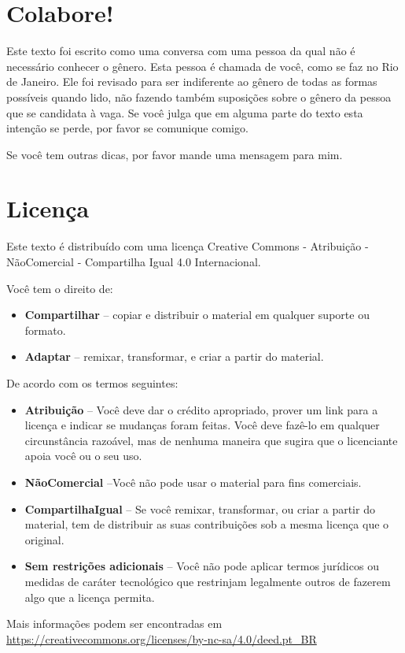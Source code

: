 \documentclass{article}
\begin{document}
\section{Colabore!}

Este texto foi escrito como uma conversa com uma pessoa da qual não é necessário conhecer o gênero. Esta pessoa é chamada de você, como se faz no Rio de Janeiro. Ele foi revisado para ser indiferente ao gênero de todas as formas possíveis quando lido, não fazendo também suposições sobre o gênero da pessoa que se candidata à vaga. Se você julga que em alguma parte do texto esta intenção se perde, por favor se comunique comigo.

Se você tem outras dicas, por favor mande uma mensagem para mim.

\section{Licença}

Este texto é distribuído com uma licença Creative Commons - Atribuição - NãoComercial - Compartilha Igual 4.0 Internacional.


Você tem o direito de:
\begin{itemize}
\item \textbf{Compartilhar} -- copiar e distribuir o material em qualquer suporte ou formato.
\item \textbf{Adaptar} -- remixar, transformar, e criar a partir do material.
\end{itemize}

De acordo com os termos seguintes:
\begin{itemize}
\item \textbf{Atribuição} -- Você deve dar o crédito apropriado, prover um link para a licença e indicar se mudanças foram feitas. Você deve fazê-lo em qualquer circunstância razoável, mas de nenhuma maneira que sugira que o licenciante apoia você ou o seu uso.
\item \textbf{NãoComercial} --Você não pode usar o material para fins comerciais.
\item \textbf{CompartilhaIgual} -- Se você remixar, transformar, ou criar a partir do material, tem de distribuir as suas contribuições sob a mesma licença que o original.
\item \textbf{Sem restrições adicionais} -- Você não pode aplicar termos jurídicos ou medidas de caráter tecnológico que restrinjam legalmente outros de fazerem algo que a licença permita.
\end{itemize}

Mais informações podem ser encontradas em \url{https://creativecommons.org/licenses/by-nc-sa/4.0/deed.pt_BR}
\end{document}

